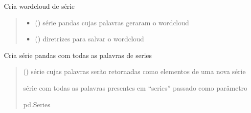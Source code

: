 \documentclass[letterpaper,10pt,english]{sphinxmanual}
\begin{document}
\begin{fulllineitems}
\label{\detokenize{index:functions.wordcloud}}
\pysigstartsignatures
{}
\pysigstopsignatures
\sphinxAtStartPar
Cria wordcloud de série
\begin{quote}\begin{description}
\begin{itemize}
\item {} 
\sphinxAtStartPar
{} () \textendash{} série pandas cujas palavras geraram o wordcloud

\item {} 
\sphinxAtStartPar
{} () \textendash{} diretrizes para salvar o wordcloud

\end{itemize}

\end{description}\end{quote}

\end{fulllineitems}


\begin{fulllineitems}
\label{\detokenize{index:functions.words}}
\pysigstartsignatures
{}
\pysigstopsignatures
\sphinxAtStartPar
Cria série pandas com todas as palavras de series
\begin{quote}\begin{description}
\sphinxAtStartPar
{} () \textendash{} série cujas palavras serão retornadas como elementos de uma nova série

\sphinxAtStartPar
série com todas as palavras presentes em “series” passado como parâmetro

\sphinxAtStartPar
pd.Series

\end{description}\end{quote}

\end{fulllineitems}
\end{document}
